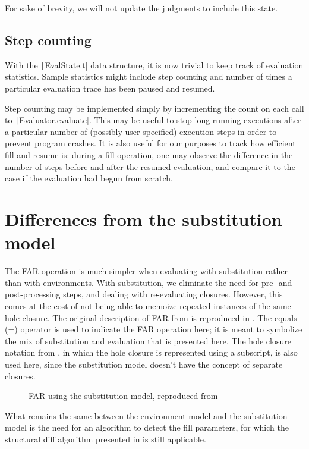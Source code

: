 For sake of brevity, we will not update the judgments to include this state.

\subsection{Step counting}
\label{sec:step-counting}

With the \texttt|EvalState.t| data structure, it is now trivial to keep track of evaluation statistics. Sample statistics might include step counting and number of times a particular evaluation trace has been paused and resumed.

Step counting may be implemented simply by incrementing the count on each call to \texttt|Evaluator.evaluate|. This may be useful to stop long-running executions after a particular number of (possibly user-specified) execution steps in order to prevent program crashes. It is also useful for our purposes to track how efficient fill-and-resume is: during a fill operation, one may observe the difference in the number of steps before and after the resumed evaluation, and compare it to the case if the evaluation had begun from scratch.

\section{Differences from the substitution model}
\label{sec:far-sub}

The FAR operation is much simpler when evaluating with substitution rather than with environments. With substitution, we eliminate the need for pre- and post-processing steps, and dealing with re-evaluating closures. However, this comes at the cost of not being able to memoize repeated instances of the same hole closure. The original description of FAR from \cite{conf/popl/HazelnutLive19} is reproduced in . The equals (=) operator is used to indicate the FAR operation here; it is meant to symbolize the mix of substitution and evaluation that is presented here. The hole closure notation from \cite{conf/popl/HazelnutLive19}, in which the hole closure is represented using a subscript, is also used here, since the substitution model doesn't have the concept of separate closures.

\begin{figure}
  \centering
  \begin{mdframed}
    \begin{singlespace}
      
    \end{singlespace}
  \end{mdframed}
  \caption{FAR using the substitution model, reproduced from \cite{conf/popl/HazelnutLive19}}
  \label{fig:far-substitution}
\end{figure}

What remains the same between the environment model and the substitution model is the need for an algorithm to detect the fill parameters, for which the structural diff algorithm presented in  is still applicable.


